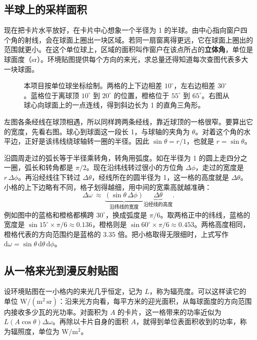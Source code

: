 \clearpage
\subsection{半球上的采样面积}\label{sec:ibl-sky}
现在把卡片水平放好，在卡片中心想象一个半径为 1 的半球。由中心指向窗户四个角的射线，会在球面上圈出一块区域。若同一扇窗离得更远，它在球面上圈出的范围就更小。在这个单位球上，区域的面积叫作窗户在该点所占的\textbf{立体角}，单位是球面度（sr）。环境贴图提供每个方向的来光，求总量还得知道每次查图代表多大一块球面。

\begin{figure}[H]\centering

\caption{本项目按单位球坐标绘制。两格的上下边相差 $10^\circ$，左右边相差 $30^\circ$。蓝格位于离球顶 $10^\circ$ 到 $20^\circ$ 的位置，橙格位于 $55^\circ$ 到 $65^\circ$。右图从球心向球面上的一点连线，得到斜边长为 1 的直角三角形。}\label{fig:ibl-sky}
\end{figure}

左图各条经线在球顶相遇，所以同样跨两条经线，靠近球顶的一格很窄。要算出它的宽度，先看右图。球心到球面这一段长 1，与球轴的夹角为 $\theta$。对着这个角的水平边，正好是该纬线绕球轴转一圈的半径。因此 $\sin\theta=r/1$，也就是 $r=\sin\theta$。

沿圆周走过的弧长等于半径乘转角，转角用弧度。如在半径为 1 的圆上走四分之一圈，弧长和转角都是 $\pi/2$。现在沿纬线转过很小的方位角 $\Delta\phi$，走过的宽度是 $r\,\Delta\phi$。再沿经线往下转过 $\Delta\theta$，经线所在的圆半径为 1，这一格的高度就是 $\Delta\theta$。小格的上下边略有不同，格子划得越细，用中间的宽乘高就越准确：
\[
 \Delta\omega\ \approx\
 \underbrace{(\sin\theta\,\Delta\phi)}_{\text{沿纬线的宽度}}
 \underbrace{\Delta\theta}_{\text{沿经线的高度}} .
\]
例如图中的蓝格和橙格都横跨 $30^\circ$，换成弧度是 $\pi/6$。取两格正中的纬线，蓝格的宽度是 $\sin15^\circ\times\pi/6\approx0.136$，橙格则是 $\sin60^\circ\times\pi/6\approx0.453$。两格高度相同，橙格代表的方向范围约是蓝格的 $3.35$ 倍。把小格取得无限细时，上式写作 $\mathrm d\omega=\sin\theta\,\mathrm d\theta\,\mathrm d\phi$。

\clearpage
\subsection{从一格来光到漫反射贴图}\label{sec:ibl-sum}
设环境贴图在一小格内的来光几乎恒定，记为 $L$，称为辐亮度。可以这样读它的单位 $\mathrm{W/(m^2\,sr)}$：沿来光方向看，每平方米的迎光面积，从每球面度的方向范围内接收多少瓦的光功率。对面积为 $A$ 的卡片，这一格带来的功率近似为 $L(A\cos\theta)\Delta\omega$。再除以卡片自身的面积 $A$，就得到单位表面积收到的功率，称为辐照度，单位为 $\mathrm{W/m^2}$。

